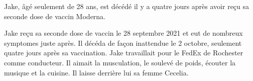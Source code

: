 Jake, âgé seulement de 28 ans, est décédé il y a quatre jours après avoir reçu
sa seconde dose de vaccin Moderna.

Jake reçu sa seconde dose de vaccin le 28 septembre 2021 et eut de nombreux
symptomes juste après. Il décéda de façon inattendue le 2 octobre, seulement
quatre jours après sa vaccination. Jake travaillait pour le FedEx de Rochester
comme conducteur. Il aimait la musculation, le soulevé de poids, écouter la
musique et la cuisine. Il laisse derrière lui sa femme Cecelia.

